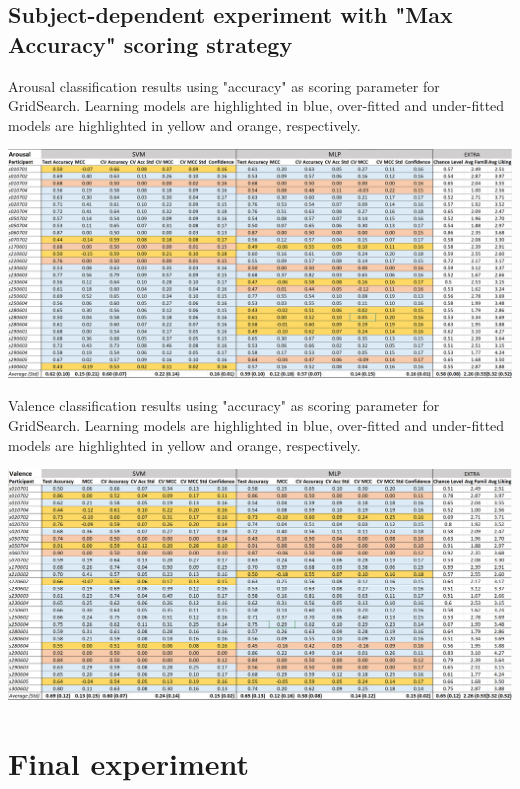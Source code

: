 \subsection{Subject-dependent experiment with "Max Accuracy" scoring strategy}
\label{sec:appendix_A3.5}

\begin{table}[h!]
  \caption{Arousal classification results using "accuracy" as scoring parameter for GridSearch. Learning models are highlighted in blue, over-fitted and under-fitted models are highlighted in yellow and orange, respectively.}
  \label{tbl:max_acc_arousal_results}
  \includegraphics[width=\linewidth]{img/appendix/arousal_max_acc_results.png}
\end{table}

\begin{table}[h!]
  \caption{Valence classification results using "accuracy" as scoring parameter for GridSearch. Learning models are highlighted in blue, over-fitted and under-fitted models are highlighted in yellow and orange, respectively.}
  \label{tbl:max_acc_valence_results}
  \includegraphics[width=\linewidth]{img/appendix/valence_max_acc_results.png}
\end{table}


\section{Final experiment}
\label{sec:appendix_A4}

